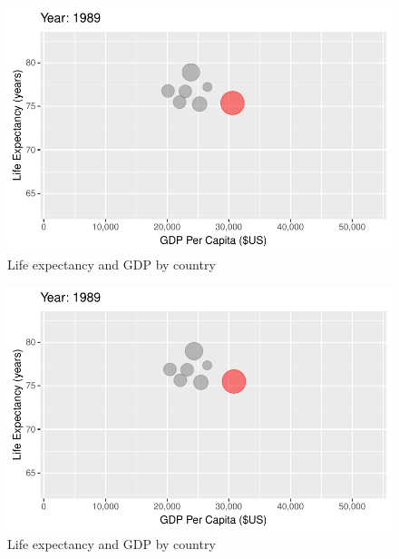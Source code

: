 \documentclass[
  letterpaper,
  DIV=11,
  numbers=noendperiod]{scrreport}
\theoremstyle{definition}
\theoremstyle{remark}
\begin{document}
\begin{figure}

{\centering \includegraphics{index_files/figure-pdf/fig-anim-country-67.pdf}

}

\caption{\label{fig-anim-country-67}Life expectancy and GDP by country}

\end{figure}

\begin{figure}

{\centering \includegraphics{index_files/figure-pdf/fig-anim-country-68.pdf}

}

\caption{\label{fig-anim-country-68}Life expectancy and GDP by country}

\end{figure}
\end{document}
